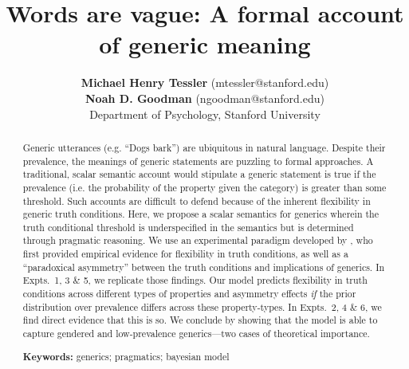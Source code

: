 \documentclass[10pt,letterpaper]{article}
\title{Words are vague: A formal account of generic meaning}
\author{{\large \bf Michael Henry Tessler} (mtessler@stanford.edu)\\ {\large \bf Noah D. Goodman} (ngoodman@stanford.edu) \\
  Department of Psychology, Stanford University}
\begin{document}
\maketitle


\begin{abstract}
Generic utterances (e.g. ``Dogs bark'') are ubiquitous in natural language. Despite their prevalence, the meanings of generic statements are puzzling to formal approaches. A traditional, scalar semantic account would stipulate a generic statement is true if the prevalence (i.e. the probability of the property given the category) is greater than some threshold. Such accounts are difficult to defend because of the inherent flexibility in generic truth conditions. Here, we propose a scalar semantics for generics wherein the truth conditional threshold is underspecified in the semantics but is determined through pragmatic reasoning. 
We use an experimental paradigm developed by , who first provided empirical evidence for flexibility in truth conditions, as well as a ``paradoxical asymmetry'' between the truth conditions and implications of generics. In Expts.~1, 3 \& 5, we replicate those findings. Our model predicts flexibility in truth conditions across different types of properties and asymmetry effects \emph{if} the prior distribution over prevalence differs across these property-types.  In Expts.~2, 4 \& 6, we find direct evidence that this is so. We conclude by showing that the model is able to capture gendered and low-prevalence generics---two cases of theoretical importance.




\textbf{Keywords:} 
generics; pragmatics; bayesian model
\end{abstract}
\end{document}
